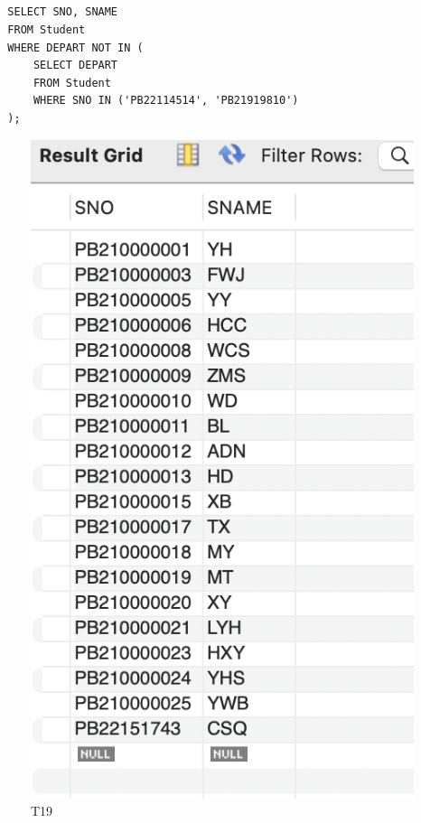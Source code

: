 \documentclass[UTF8]{ctexart}
\begin{document}
\subsection{}
\begin{lstlisting}
  SELECT SNO, SNAME
  FROM Student
  WHERE DEPART NOT IN (
      SELECT DEPART
      FROM Student
      WHERE SNO IN ('PB22114514', 'PB21919810')
  );
\end{lstlisting}
\begin{figure}[H]
  \centering
  \includegraphics[scale=0.7]{pics/19.png}
  \caption*{T19}
\end{figure}
\end{document}

